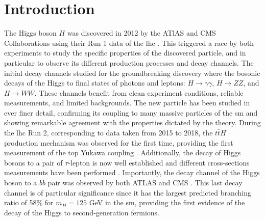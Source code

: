 \section{Introduction}
The Higgs boson $H$ \cite{Englert:1964et, PhysRevLett.13.508, Higgs:1964ia, PhysRevLett.13.585} was discovered in 2012 by the ATlAS and CMS Collaborations using their Run 1 data of the \gls{lhc} \cite{ATLAS:2012yve, CMS:2012qbp}. This triggered a race by both experiments to study the specific properties of the discovered particle, and in particular to observe its different production processes and decay channels. The initial decay channels studied for the groundbreaking discovery where the bosonic decays of the Higgs to final states of photons and leptons: $H \rightarrow \gamma\gamma$, $H \rightarrow ZZ$, and $H \rightarrow WW$. These channels benefit from clean experiment conditions, reliable measurements, and limited backgrounds. The new particle has been studied in ever finer detail, confirming its coupling to many massive particles of the \gls{sm} and showing remarkable agreement with the properties dictated by the theory. During the \gls{lhc} Run 2, corresponding to data taken from 2015 to 2018, the $t\bar{t}H$ production mechanism was observed for the first time, providing the first measurement of the top Yukawa coupling \cite{ATLAS:2018mme, CMS:2018uxb}. Additionally, the decay of Higgs bosons to a pair of $\tau$-lepton is now well established and different cross-sections measurements have been performed \cite{atlasTauMeasu, CMS:2021gxc}. Importantly, the decay channel of the Higgs boson to a $b\bar{b}$ pair was observed by both ATLAS and CMS \cite{ATLAS:2018kot, CMS:2018nsn}. This last decay channel is of particular significance since it has the largest predicted branching ratio of 58\% for $m_H = 125$ GeV in the \gls{sm}, providing the first evidence of the decay of the Higgs to second-generation fermions. \\ 

